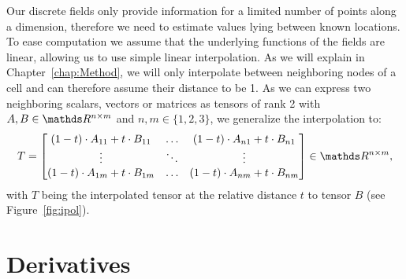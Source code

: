 Our discrete fields only provide information for a limited number of
points along a dimension, therefore we need to estimate values lying
between known locations. To ease computation we assume that the
underlying functions of the fields are linear, allowing us to use simple
linear interpolation. As we will explain in Chapter~\ref{chap:Method},
we will only interpolate between neighboring nodes of a cell and can
therefore assume their distance to be 1. As we can express two
neighboring scalars, vectors or matrices as tensors of rank 2 with $A, B
\in \real^{n \times m}$ and $n,m \in \{1,2,3\}$, we generalize the
interpolation to:
\begin{equation}
  T =
  \begin{bmatrix}
    (1-t) \cdot A_{11} + t \cdot B_{11} & \dots & (1-t) \cdot A_{n1} + t \cdot B_{n1} \\
    \vdots & \ddots & \vdots \\
    (1-t) \cdot A_{1m} + t \cdot B_{1m} & \dots & (1-t) \cdot A_{nm} + t \cdot B_{nm} \\
  \end{bmatrix}
  \in \real^{n \times m},
\end{equation}
with $T$ being the interpolated tensor at the relative distance $t$ to
tensor $B$ (see Figure~\ref{fig:ipol}).

\section{Derivatives}\label{sec:derivatives}


